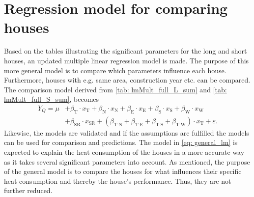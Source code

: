 \begin{table}
    \centering
\caption{The distribution of significant parameters from the multiple linear regression model for short houses. As for the long houses, the total of the signifance is in relation to the number of long houses}
\label{tab: lmMult_full_S_sum}
\end{table}



\section{Regression model for comparing houses}
Based on the tables illustrating the significant parameters for the long and short houses, an updated multiple linear regression model is made. The purpose of this more general model is to compare which parameters influence each house. Furthermore, houses with e.g. same area, construction year etc. can be compared. The comparison model derived from \cref{tab: lmMult_full_L_sum} and \cref{tab: lmMult_full_S_sum}, becomes
\begin{align}
        Y_{Q} = \mu & + \beta_{\text{T}}\cdot x_{\text{T}} + \beta_{\text{N}}\cdot x_{\text{N}} + \beta_{\text{E}}\cdot x_{\text{E}}+ \beta_{\text{S}}\cdot x_{\text{S}} + \beta_{\text{W}}\cdot x_{\text{W}} \nonumber \\ & + \beta_{\text{SR}}\cdot x_{\text{SR}} + (\beta_{\text{T:N}} + \beta_{\text{T:E}} + \beta_{\text{T:S}} + \beta_{\text{T:W}}) \cdot x_{\text{T}} + \varepsilon. \label{eq: general_lm}
\end{align}
Likewise, the models are validated and if the assumptions are fulfilled the models can be used for comparison and predictions. The model in \cref{eq: general_lm} is expected to explain the heat consumption of the houses in a more accurate way as it takes several significant parameters into account. As mentioned, the purpose of the general model is to compare the houses for what influences their specific heat consumption and thereby the house's performance. Thus, they are not further reduced. 

